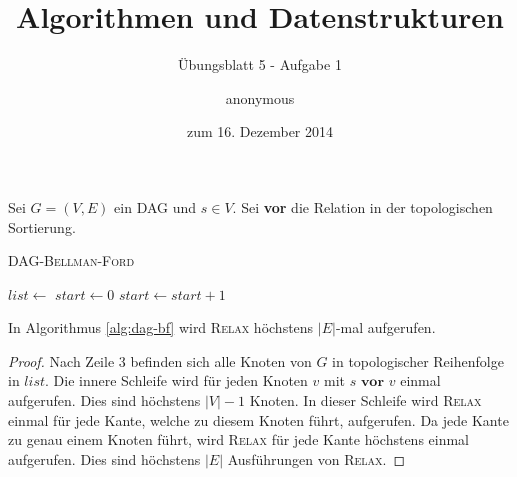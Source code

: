 \documentclass[a4paper]{scrartcl}
\title{Algorithmen und Datenstrukturen}
\subtitle{Übungsblatt 5 - Aufgabe 1}
\author{
    anonymous
}
\date{zum 16. Dezember 2014}
\begin{document}
\maketitle

Sei $G = (V, E)$ ein DAG und $s \in V$.
Sei \textbf{vor} die Relation in der topologischen Sortierung.

\begin{algorithm}
    \caption{\textsc{DAG-Bellman-Ford}}
    \label{alg:dag-bf}
    \begin{algorithmic}[1]
            \State {}
            \State $list \gets$ 
            \State $start \gets 0$
                \State $start \gets start + 1$
            \EndWhile
                    \State {}
                \EndFor
            \EndFor
        \EndProcedure
    \end{algorithmic}
\end{algorithm}

\begin{behaupt}
    In Algorithmus \ref{alg:dag-bf} wird \textsc{Relax} höchstens $|E|$-mal
    aufgerufen.
\end{behaupt}
\begin{proof}
    Nach Zeile 3 befinden sich alle Knoten von $G$ in topologischer Reihenfolge
    in $list$.
    Die innere Schleife wird für jeden Knoten $v$ mit $s \textbf{ vor } v$
    einmal aufgerufen.
    Dies sind höchstens $|V| - 1$ Knoten.
    In dieser Schleife wird \textsc{Relax} einmal für jede Kante, welche zu
    diesem Knoten führt, aufgerufen.
    Da jede Kante zu genau einem Knoten führt, wird \textsc{Relax} für jede
    Kante höchstens einmal aufgerufen.
    Dies sind höchstens $|E|$ Ausführungen von \textsc{Relax}.
\end{proof}
\end{document}
